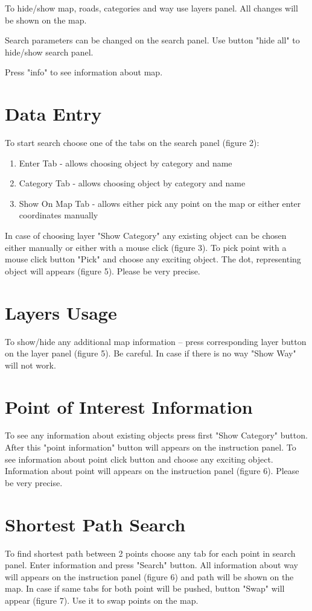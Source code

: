 	To hide/show map, roads, categories and way use layers panel. All changes will be shown on the map. 
	
	Search parameters can be changed on the search panel. Use button "hide all" to hide/show search panel.
	
	Press "info" to see information about map.
	
\section{Data Entry}
		To start search choose one of the tabs on the search panel (figure 2):
		
		\begin{enumerate}
			\item Enter Tab - allows choosing object by category and name
			\item Category Tab - allows choosing object by category and name
			\item Show On Map Tab - allows either pick any point on the map or either enter coordinates manually
		\end{enumerate}
		
		In case of choosing layer "Show Category" any existing object can be chosen either manually or either with a mouse click (figure 3).
		To pick point with a mouse click button "Pick" and choose any exciting object. The dot, representing object will appears (figure 5). Please be very precise.
		
\section{Layers Usage}
	To show/hide any additional map information – press corresponding layer button on the layer panel (figure 5). Be careful. In case if there is no way "Show Way" will not work.
	
\section{Point of Interest Information}
	To see any information about existing objects press first "Show Category" button. After this "point information" button will appears on the instruction panel. To see information about point click button and choose any exciting object. Information about point will appears on the instruction panel (figure 6). Please be very precise.

\section{Shortest Path Search}
	To find shortest path between 2 points choose any tab for each point in search panel. Enter information and press "Search" button.  All information about way will appears on the instruction panel (figure 6) and path will be shown on the map.
	In case if same tabs for both point will be pushed, button "Swap" will appear (figure 7). Use it to swap points on the map.
	

